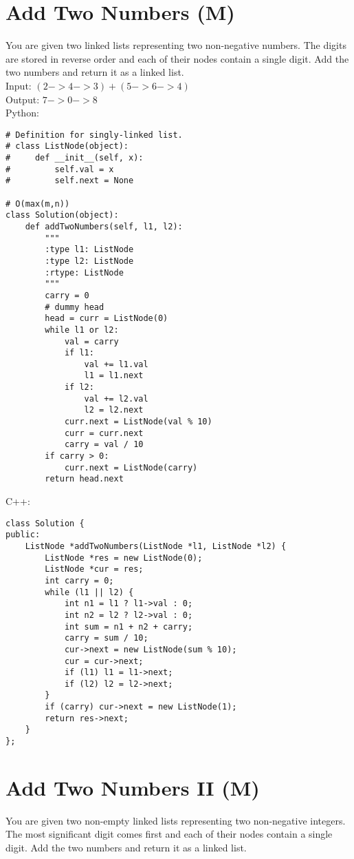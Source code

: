 \section{Add Two Numbers (M)}
You are given two linked lists representing two non-negative numbers. The digits are stored in reverse order and each of their nodes contain a single digit. Add the two numbers and return it as a linked list.\\

Input: $(2 -> 4 -> 3) + (5 -> 6 -> 4)$ \\
Output: $7 -> 0 -> 8$\\

Python:
\lstset{language=python}
\begin{lstlisting}
# Definition for singly-linked list.
# class ListNode(object):
#     def __init__(self, x):
#         self.val = x
#         self.next = None

# O(max(m,n))
class Solution(object):
    def addTwoNumbers(self, l1, l2):
        """
        :type l1: ListNode
        :type l2: ListNode
        :rtype: ListNode
        """
        carry = 0
        # dummy head
        head = curr = ListNode(0)
        while l1 or l2:
            val = carry
            if l1:
                val += l1.val
                l1 = l1.next
            if l2:
                val += l2.val
                l2 = l2.next
            curr.next = ListNode(val % 10)
            curr = curr.next
            carry = val / 10
        if carry > 0:
            curr.next = ListNode(carry)
        return head.next
\end{lstlisting}

C++:
\lstset{language=C++}
\begin{lstlisting}
class Solution {
public:
    ListNode *addTwoNumbers(ListNode *l1, ListNode *l2) {
        ListNode *res = new ListNode(0);
        ListNode *cur = res;
        int carry = 0;
        while (l1 || l2) {
            int n1 = l1 ? l1->val : 0;
            int n2 = l2 ? l2->val : 0;
            int sum = n1 + n2 + carry;
            carry = sum / 10;
            cur->next = new ListNode(sum % 10);
            cur = cur->next;
            if (l1) l1 = l1->next;
            if (l2) l2 = l2->next;
        }
        if (carry) cur->next = new ListNode(1);
        return res->next;
    }
};
\end{lstlisting}

\section{Add Two Numbers II (M)}
You are given two non-empty linked lists representing two non-negative integers. The most significant digit comes first and each of their nodes contain a single digit. Add the two numbers and return it as a linked list.\\

